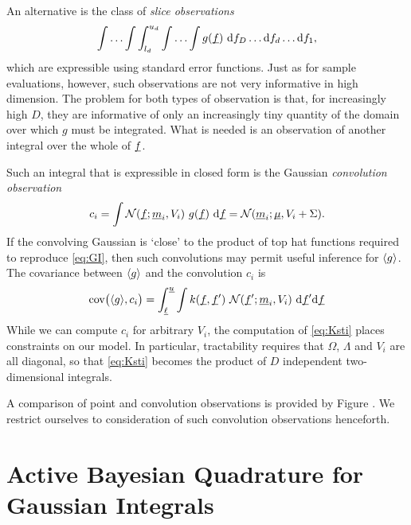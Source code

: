 \documentclass[twoside]{article}
\begin{document}
An alternative is the class of \emph{slice observations}
\begin{equation}
 \int \ldots \int \int_{l_d}^{u_d} \int \ldots \int g(\underline{\smash{f}})~\mathrm{d} f_D \ldots \mathrm{d} f_d\ldots \mathrm{d} f_1,
\end{equation}
which are expressible using standard error functions. Just as for sample evaluations, however, such observations are not very informative in high dimension. The problem for both types of observation is that, for increasingly high $D$, they are informative of only an increasingly tiny quantity of the domain over which $g$ must be integrated. What is needed is an observation of another integral over the whole of $\underline{\smash{f}}$.

Such an integral that is expressible in closed form is the Gaussian \emph{convolution observation}
 \begin{equation}\label{eq:conv}
 c_i = \int \mathcal{N}(\underline{\smash{f}};\underline{\smash{m}}_i,V_i)~g(\underline{\smash{f}})~\mathrm{d} \underline{\smash{f}} = \mathcal{N}(\underline{\smash{m}}_i;\underline{\smash{\mu}},V_i+\Sigma).
\end{equation}
 If the convolving Gaussian is `close' to the product of top hat functions required to reproduce \eqref{eq:GI}, then such convolutions may permit useful inference for $\langle g \rangle$. The covariance between $\langle g \rangle$ and the convolution $c_i$ is
\begin{align}\label{eq:Ksti}
\text{cov}\bigl(\langle g \rangle, c_i\bigr) =
\int_{\underline{\smash{\ell}}}^{\underline{\smash{u}}} \int  k(\underline{\smash{f}}, \underline{\smash{f}}')~\mathcal{N}(\underline{\smash{f}}';\underline{\smash{m}}_i,V_i)~\mathrm{d} \underline{\smash{f}}' \mathrm{d} \underline{\smash{f}} 
\end{align}
While we can compute $c_i$ for arbitrary $V_i$, the computation of \eqref{eq:Ksti} places constraints on our model. In particular, tractability requires that $\Omega$, $\Lambda$ and $V_i$ are all diagonal, so that \eqref{eq:Ksti} becomes the product of $D$ independent two-dimensional integrals.

A comparison of point and convolution observations is provided by Figure \label{fig:observations}. 
We restrict ourselves to consideration of such convolution observations henceforth.


\section{Active Bayesian Quadrature for Gaussian Integrals}





\end{document}

